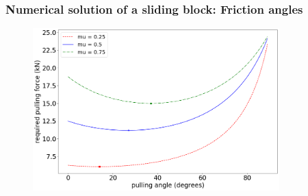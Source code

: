 \documentclass[notes]{beamer}
\begin{document}
\begin{frame}
	\frametitle{Numerical solution of a sliding block: Friction angles}	
	\begin{figure}[ht]
		\centering
		\includegraphics[width=0.85\textwidth]{figs/sliding-block-force-frictions.png}
	\end{figure}
\end{frame}
\end{document}
